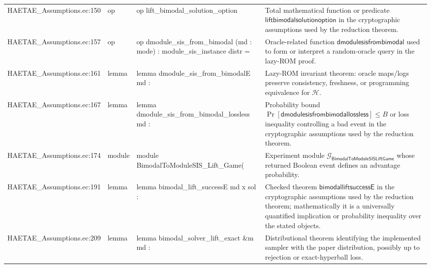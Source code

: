 \documentclass[10pt]{article}
\begin{document}
\begin{longtable}{L{0.11\textwidth}L{0.055\textwidth}L{0.385\textwidth}L{0.41\textwidth}}
HAETAE\_\allowbreak{}Assumptions.\allowbreak{}ec:\allowbreak{}150 & op & {\ttfamily\scriptsize op lift\_\allowbreak{}bimodal\_\allowbreak{}solution\_\allowbreak{}option} & Total mathematical function or predicate $\mathsf{liftbimodalsolutionoption}$ in the cryptographic assumptions used by the reduction theorem. \\
HAETAE\_\allowbreak{}Assumptions.\allowbreak{}ec:\allowbreak{}157 & op & {\ttfamily\scriptsize op dmodule\_\allowbreak{}sis\_\allowbreak{}from\_\allowbreak{}bimodal (md : mode) : module\_\allowbreak{}sis\_\allowbreak{}instance distr =} & Oracle-related function $\mathsf{dmodulesisfrombimodal}$ used to form or interpret a random-oracle query in the lazy-ROM proof. \\
HAETAE\_\allowbreak{}Assumptions.\allowbreak{}ec:\allowbreak{}161 & lemma & {\ttfamily\scriptsize lemma dmodule\_\allowbreak{}sis\_\allowbreak{}from\_\allowbreak{}bimodalE md :} & Lazy-ROM invariant theorem: oracle maps/logs preserve consistency, freshness, or programming equivalence for $\mathcal H$. \\
HAETAE\_\allowbreak{}Assumptions.\allowbreak{}ec:\allowbreak{}167 & lemma & {\ttfamily\scriptsize lemma dmodule\_\allowbreak{}sis\_\allowbreak{}from\_\allowbreak{}bimodal\_\allowbreak{}lossless md :} & Probability bound $\Pr[\mathsf{dmodulesisfrombimodallossless}]\le B$ or loss inequality controlling a bad event in the cryptographic assumptions used by the reduction theorem. \\
HAETAE\_\allowbreak{}Assumptions.\allowbreak{}ec:\allowbreak{}174 & module & {\ttfamily\scriptsize module BimodalToModuleSIS\_\allowbreak{}Lift\_\allowbreak{}Game(} & Experiment module $\mathcal G_{\mathsf{BimodalToModuleSISLiftGame}}$ whose returned Boolean event defines an advantage probability. \\
HAETAE\_\allowbreak{}Assumptions.\allowbreak{}ec:\allowbreak{}191 & lemma & {\ttfamily\scriptsize lemma bimodal\_\allowbreak{}lift\_\allowbreak{}successE md x sol :} & Checked theorem $\mathsf{bimodalliftsuccessE}$ in the cryptographic assumptions used by the reduction theorem; mathematically it is a universally quantified implication or probability inequality over the stated objects. \\
HAETAE\_\allowbreak{}Assumptions.\allowbreak{}ec:\allowbreak{}209 & lemma & {\ttfamily\scriptsize lemma bimodal\_\allowbreak{}solver\_\allowbreak{}lift\_\allowbreak{}exact \&m md :} & Distributional theorem identifying the implemented sampler with the paper distribution, possibly up to rejection or exact-hyperball loss. \\

\end{longtable}
\end{document}
